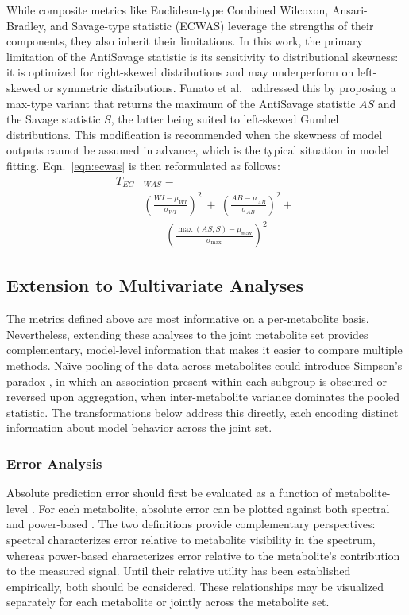 While composite metrics like Euclidean-type Combined Wilcoxon, Ansari-Bradley, and Savage-type statistic (ECWAS) leverage the strengths of their components, they also inherit their limitations. In this work, the primary limitation of the AntiSavage statistic is its sensitivity to distributional skewness: it is optimized for right-skewed distributions and may underperform on left-skewed or symmetric distributions. Funato et al.~\cite{Funato2024} addressed this by proposing a max-type variant that returns the maximum of the AntiSavage statistic $AS$ and the Savage statistic $S$, the latter being suited to left-skewed Gumbel distributions. This modification is recommended when the skewness of \DL model outputs cannot be assumed in advance, which is the typical situation in model fitting. Eqn.~\ref{eqn:ecwas} is then reformulated as follows:
\begin{equation}\label{eqn:funato}
    \begin{aligned}
        T_{EC}& _{WAS} = \\&\left(\frac{WI-\mu_{WI}}{\sigma_{WI}}\right)^2\ +\ 
        \left(\frac{AB-\mu_{AB}}{\sigma_{AB}}\right)^2+\ \\[1pt]
        &\phantom{\left(\frac{WI}{\sigma}\right.}
        \left(\frac{\max(AS,S)-\mu_{\max}}{\sigma_{\max}}\right)^2
    \end{aligned}
\end{equation}

\subsection{Extension to Multivariate Analyses}
\label{sec:Eval:subsec:multivariate}
The metrics defined above are most informative on a per-metabolite basis. Nevertheless, extending these analyses to the joint metabolite set provides complementary, model-level information that makes it easier to compare multiple methods. Na\"{\i}ve pooling of the data across metabolites could introduce Simpson's paradox \cite{Blyth1972, Simpson1951}, in which an association present within each subgroup is obscured or reversed upon aggregation, when inter-metabolite variance dominates the pooled statistic. The transformations below address this directly, each encoding distinct information about model behavior across the joint set. 

\subsubsection{Error Analysis}
\label{sec:Eval:subsec:multivariate:subsubsec:error}
Absolute prediction error should first be evaluated as a function of metabolite-level \mSNR. For each metabolite, absolute error can be plotted against both spectral and power-based \mSNR. The two definitions provide complementary perspectives: spectral \mSNR characterizes error relative to metabolite visibility in the spectrum, whereas power-based \mSNR characterizes error relative to the metabolite's contribution to the measured signal. Until their relative utility has been established empirically, both should be considered. These relationships may be visualized separately for each metabolite or jointly across the metabolite set. 

